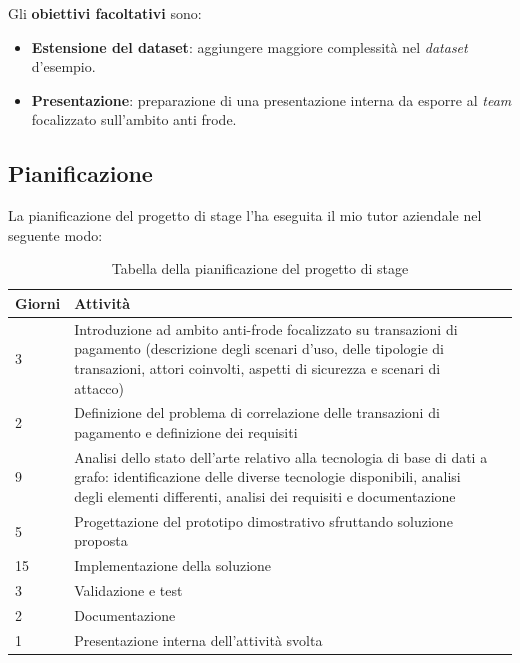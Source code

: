 Gli \textbf{obiettivi facoltativi} sono:
\begin{itemize}
\item{\textbf{Estensione del dataset}:} aggiungere maggiore complessità nel \textit{dataset} d'esempio.
\item{\textbf{Presentazione}:} preparazione di una presentazione interna da esporre al \textit{team} focalizzato sull'ambito anti frode.
\end{itemize}
\newpage
\subsection{Pianificazione}
\label{sec:pian}
La pianificazione del progetto di stage l'ha eseguita il mio tutor aziendale nel seguente modo:

\label{tab:pian}
\begin{table}[!ht]

\begin{tabularx}{\textwidth}{lXl}
\hline\hline
\textbf{Giorni} & \textbf{Attività} \\
\hline
3	& Introduzione ad ambito anti-frode focalizzato su transazioni di pagamento (descrizione degli scenari d'uso, delle tipologie di transazioni, attori coinvolti, aspetti di sicurezza e scenari di attacco)\\
\hline
2	& Definizione del problema di correlazione delle transazioni di pagamento e definizione dei requisiti\\
\hline
9	& Analisi dello stato dell'arte relativo alla tecnologia di base di dati a grafo: identificazione delle diverse tecnologie disponibili, analisi degli elementi differenti, analisi dei requisiti e documentazione\\
\hline
5	& Progettazione del prototipo dimostrativo sfruttando soluzione proposta\\
\hline
15	& Implementazione della soluzione\\
\hline
3	& Validazione e test \\
\hline
2	 & Documentazione\\
\hline
1	& Presentazione interna dell'attività svolta\\
\hline
\end{tabularx}
\\
\caption{Tabella della pianificazione del progetto di stage}
\end{table}%



